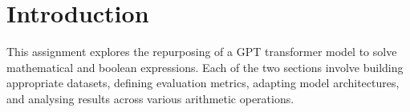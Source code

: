 \section{Introduction}
This assignment explores the repurposing of a GPT transformer model to solve mathematical and boolean expressions. Each of the two sections involve building appropriate datasets, defining evaluation metrics, adapting model architectures, and analysing results across various arithmetic operations.

